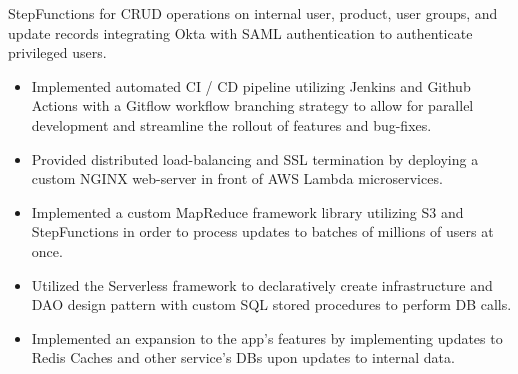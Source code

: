 \documentclass{ExpressiveResume}
\begin{document}
{{{            StepFunctions for CRUD operations on internal user, product, user
            groups, and update records integrating Okta with SAML authentication
            to authenticate privileged users.
            \begin{itemize}
                \item Implemented automated CI / CD pipeline utilizing
                      Jenkins and Github Actions with a Gitflow workflow
                      branching strategy to allow for parallel development
                      and streamline the rollout of features and bug-fixes.
                \item Provided distributed load-balancing and SSL
                      termination by deploying a custom NGINX web-server in
                      front of AWS Lambda microservices.
                \item Implemented a custom MapReduce framework library
                      utilizing S3 and StepFunctions in order to process
                      updates to batches of millions of users at once.
                \item Utilized the Serverless framework to declaratively
                      create infrastructure and DAO design pattern with custom
                      SQL stored procedures to perform DB calls.
                \item Implemented an expansion to the app's features by
                      implementing updates to Redis Caches and other service's
                      DBs upon updates to internal data.
            \end{itemize}
        }


}}
\end{document}

